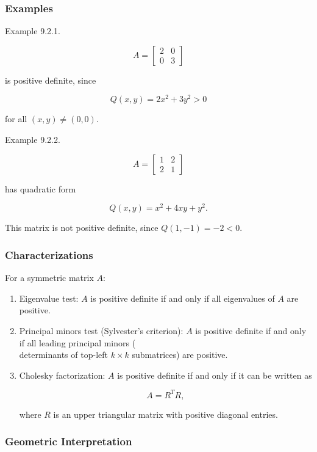\documentclass[
  12pt,
  a4paper,
]{article}
\begin{document}
\subsubsection{Examples}\label{examples-10}

Example 9.2.1.

\[A = \begin{bmatrix}
2 & 0 \\
0 & 3 \end{bmatrix}\]

is positive definite, since

\[Q(x,y) = 2x^2 + 3y^2 > 0\]

for all \((x,y) \neq (0,0)\).

Example 9.2.2.

\[A = \begin{bmatrix}
1 & 2 \\
2 & 1 \end{bmatrix}\]

has quadratic form

\[Q(x,y) = x^2 + 4xy + y^2.\]

This matrix is not positive definite, since \(Q(1,-1) = -2 < 0\).

\subsubsection{Characterizations}\label{characterizations}

For a symmetric matrix \(A\):

\begin{enumerate}
\def\labelenumi{\arabic{enumi}.}
\item
  Eigenvalue test: \(A\) is positive definite if and only if all
  eigenvalues of \(A\) are positive.
\item
  Principal minors test (Sylvester's criterion): \(A\) is positive
  definite if and only if all leading principal minors (\\
  determinants of top-left \(k \times k\) submatrices) are positive.
\item
  Cholesky factorization: \(A\) is positive definite if and only if it
  can be written as

  \[A = R^T R,\]

  where \(R\) is an upper triangular matrix with positive diagonal
  entries.
\end{enumerate}

\subsubsection{Geometric
Interpretation}\label{geometric-interpretation-21}
\end{document}
